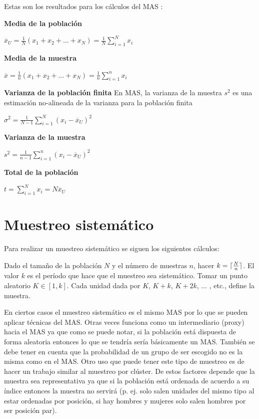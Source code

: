 \documentclass{report}
\DeclarePairedDelimiter{\ceil}{\lceil}{\rceil}
\begin{document}
\bigbreak

Estas son los resultados para los cálculos del MAS \cite{thompson-2012}:

\bigbreak
\textbf{Media de la población}

\bigbreak

$\overline{x}_U = \frac{1}{N}(x_1 + x_2 + ... + x_N) = \frac{1}{N} \sum_{i=1}^N x_i$


\bigbreak
\textbf{Media de la muestra}

\bigbreak

$\overline{x} = \frac{1}{n}(x_1 + x_2 + ... + x_N) = \frac{1}{n} \sum_{i=1}^n x_i$


\bigbreak
\textbf{Varianza de la población finita} En MAS, la varianza de la muestra $s^2$ es una estimación no-alineada de la varianza para la población finita

\bigbreak

$\sigma ^2 = \frac{1}{N-1} \sum_{i=1}^{N} (x_i - \overline{x}_U)^2$


\bigbreak
\textbf{Varianza de la muestra}

\bigbreak

$s^2 = \frac{1}{n-1} \sum_{i=1}^n (x_i - \overline{x}_U)^2$


\bigbreak
\textbf{Total de la población}

\bigbreak

$t = \sum_{i=1}^N x_i = N \overline{x}_U$


\section{Muestreo sistemático}

Para realizar un muestreo sistemático se siguen los siguientes cálculos:

\bigbreak

Dado el tamaño de la población $N$ y el número de muestras $n$, hacer $k=\ceil{\frac{N}{n}}$. El valor $k$ es el período que hace que el muestreo sea sistemático. Tomar un punto aleatorio $K \in [1, k]$. Cada unidad dada por $K$, $K + k$, $K + 2k$, ... , etc., define la muestra.

\bigbreak

En ciertos casos el muestreo sistemático es el mismo MAS por lo que se pueden aplicar técnicas del MAS. Otras veces funciona como un intermediario (proxy) hacia el MAS ya que como se puede notar, si la población está dispuesta de forma aleatoria entonces lo que se tendría sería básicamente un MAS. También se debe tener en cuenta que la probabilidad de un grupo de ser escogido no es la misma como en el MAS. Otro uso que puede tener este tipo de muestreo es de hacer un trabajo similar al muestreo por clúster. De estos factores depende que la muestra sea representativa ya que si la población está ordenada de acuerdo a su índice entonces la muestra no servirá (p. ej. solo salen unidades del mismo tipo al estar ordenadas por posición, si hay hombres y mujeres solo salen hombres por ser posición par). 
\end{document}
